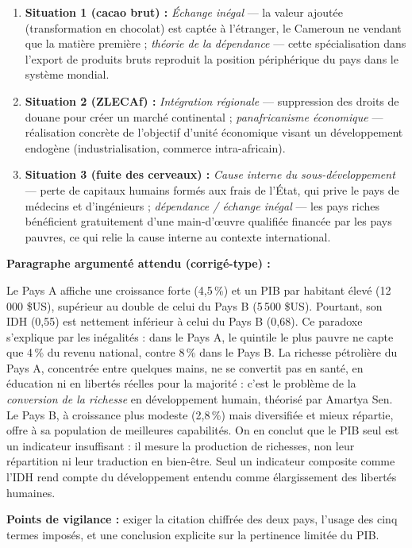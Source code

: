 \documentclass[11pt]{article}
\begin{document}
\begin{corrige}
\begin{enumerate}
\item \textbf{Situation 1 (cacao brut) :} \emph{Échange inégal} — la valeur ajoutée (transformation en chocolat) est captée à l'étranger, le Cameroun ne vendant que la matière première ; \emph{théorie de la dépendance} — cette spécialisation dans l'export de produits bruts reproduit la position périphérique du pays dans le système mondial.
\item \textbf{Situation 2 (ZLECAf) :} \emph{Intégration régionale} — suppression des droits de douane pour créer un marché continental ; \emph{panafricanisme économique} — réalisation concrète de l'objectif d'unité économique visant un développement endogène (industrialisation, commerce intra-africain).
\item \textbf{Situation 3 (fuite des cerveaux) :} \emph{Cause interne du sous-développement} — perte de capitaux humains formés aux frais de l'État, qui prive le pays de médecins et d'ingénieurs ; \emph{dépendance / échange inégal} — les pays riches bénéficient gratuitement d'une main-d'œuvre qualifiée financée par les pays pauvres, ce qui relie la cause interne au contexte international.
\end{enumerate}
\end{corrige}

\begin{corrige}
\textbf{Paragraphe argumenté attendu (corrigé-type) :}

Le Pays A affiche une croissance forte (4{,}5\,\%) et un PIB par habitant élevé (12\,000 \$US), supérieur au double de celui du Pays B (5\,500 \$US). Pourtant, son IDH (0{,}55) est nettement inférieur à celui du Pays B (0{,}68). Ce paradoxe s'explique par les inégalités : dans le Pays A, le quintile le plus pauvre ne capte que 4\,\% du revenu national, contre 8\,\% dans le Pays B. La richesse pétrolière du Pays A, concentrée entre quelques mains, ne se convertit pas en santé, en éducation ni en libertés réelles pour la majorité : c'est le problème de la \emph{conversion de la richesse} en développement humain, théorisé par Amartya Sen. Le Pays B, à croissance plus modeste (2{,}8\,\%) mais diversifiée et mieux répartie, offre à sa population de meilleures capabilités. On en conclut que le PIB seul est un indicateur insuffisant : il mesure la production de richesses, non leur répartition ni leur traduction en bien-être. Seul un indicateur composite comme l'IDH rend compte du développement entendu comme élargissement des libertés humaines.

\textbf{Points de vigilance :} exiger la citation chiffrée des deux pays, l'usage des cinq termes imposés, et une conclusion explicite sur la pertinence limitée du PIB.
\end{corrige}
\end{document}
